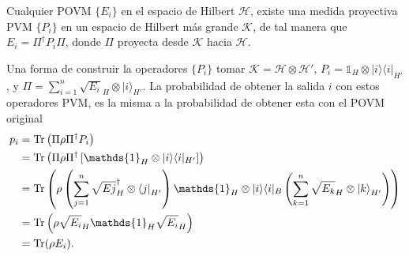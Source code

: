 \begin{theorem} Cualquier POVM $\{E_i\}$ en el espacio de Hilbert $\mathcal{H}$, existe una medida proyectiva PVM $\{P_i\}$ en un espacio de Hilbert más grande $\mathcal{K}$, de tal manera que $E_i=\Pi^\dagger P_i\Pi$, donde $\Pi$ proyecta desde $\mathcal{K}$ hacia $\mathcal{H}$.
\end{theorem}
	

Una forma de construir la operadores $\{P_i\}$ tomar  $\mathcal{K}=\mathcal{H}\otimes\mathcal{H'}$, $P _{i}=\mathds{1} _{H}\otimes |i\rangle \langle i|_{H'}$, y
$\Pi=\sum _{i=1}^{n}{\sqrt {E_{i}}}_{H}\otimes {|i\rangle }_{H'}$. La probabilidad de obtener la salida $i$ con estos operadores PVM, es la misma a la probabilidad de obtener esta con el POVM original {\cite{2007geometry}}
\begin{equation}
 \begin{split}
 p_i&=\tr \left(\Pi\rho\Pi^{\dagger }P _{i}\right)\\
 &=\tr \left(\Pi\rho \Pi^{\dagger }\left[\mathds{1}_{H}\otimes |i\rangle \langle i|_{H'}\right]\right)\\
 &=\tr \left(\rho\left(\sum _{j=1}^{n}{\sqrt {E{j}}}_{H}^{\dagger }\otimes {\langle j|}_{H'}\right)\mathds{1} _{H}\otimes |i\rangle \langle i|_{B}\left(\sum _{k=1}^{n}{\sqrt {E_{k}}}_{H}\otimes {|k\rangle }_{H'}\right)\right)\\
 &=\tr \left(\rho {\sqrt {E_{i}}}_{H}\mathds{1} _{H}{\sqrt {E_{i}}}_{H}\right)\\
 &=\tr (\rho E_{i}).
 \end{split}
\end{equation}
































